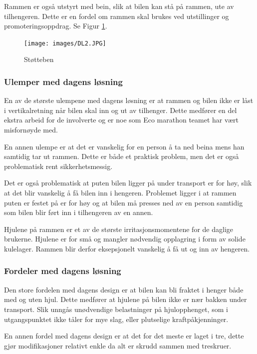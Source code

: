 Rammen er også utstyrt med bein, slik at bilen kan stå på rammen, ute av tilhengeren. Dette er en fordel om rammen skal brukes ved utstillinger og promoteringsoppdrag.  Se Figur \ref{F3}. 

\begin{figure}[H]
\centerline{\texttt{[image: images/DL2.JPG]}}
\caption{Støtteben}
\label{F3}
\end{figure}

\subsubsection{Ulemper med dagens løsning}

En av de største ulempene med dagens løsning er at rammen og bilen ikke er låst i vertikalretning når bilen skal inn og ut av tilhenger. Dette medfører en del ekstra arbeid for de involverte og er noe som Eco marathon teamet har vært misfornøyde med.

En annen ulempe er at det er vanskelig for en person å ta ned beina mens han samtidig tar ut rammen. Dette er både et praktisk problem, men det er også problematisk rent sikkerhetsmessig. 

Det er også problematisk at puten bilen ligger på under transport er for høy, slik at det blir vanskelig å få bilen inn i hengeren. Problemet ligger i at rammen puten er festet på er for høy og at bilen må presses ned av en person samtidig som bilen blir ført inn i tilhengeren av en annen.

Hjulene på rammen er et av de største irritasjonsmomentene for de daglige brukerne. Hjulene er for små og mangler nødvendig opplagring i form av solide kulelager. Rammen blir derfor eksepsjonelt vanskelig å få ut og inn av hengeren. 

\subsubsection{Fordeler med dagens løsning}

Den store fordelen med dagens design er at bilen kan bli fraktet i henger både med og uten hjul. Dette medfører at hjulene på bilen ikke er nær bakken under transport. Slik unngås unødvendige belastninger på hjulopphenget, som i utgangspunktet ikke tåler for mye slag, eller plutselige kraftpåkjenninger. 

En annen fordel med dagens design er at det for det meste er laget i tre, dette gjør modifikasjoner relativt enkle da alt er skrudd sammen med treskruer.


